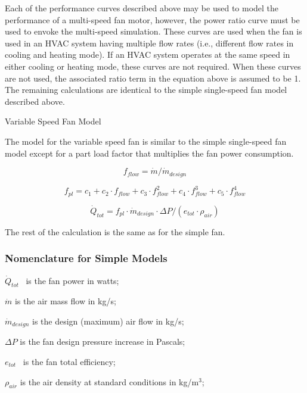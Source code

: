 Each of the performance curves described above may be used to model the performance of a multi-speed fan motor, however, the power ratio curve must be used to envoke the multi-speed simulation. These curves are used when the fan is used in an HVAC system having multiple flow rates (i.e., different flow rates in cooling and heating mode). If an HVAC system operates at the same speed in either cooling or heating mode, these curves are not required. When these curves are not used, the associated ratio term in the equation above is assumed to be 1. The remaining calculations are identical to the simple single-speed fan model described above.

Variable Speed Fan Model

The model for the variable speed fan is similar to the simple single-speed fan model except for a part load factor that multiplies the fan power consumption.

\begin{equation}
{f_{flow}} = \dot m/{\dot m_{design}}
\end{equation}

\begin{equation}
{f_{pl}} = {c_1} + {c_2} \cdot {f_{flow}} + {c_3} \cdot f_{flow}^2 + {c_4} \cdot f_{flow}^3 + {c_5} \cdot f_{flow}^4
\end{equation}

\begin{equation}
{\dot Q_{tot}} = {f_{pl}}\cdot {\dot m_{design}}\cdot \Delta P/\left( {{e_{tot}}\cdot {\rho_{air}}} \right)
\end{equation}

The rest of the calculation is the same as for the simple fan.

\subsubsection{Nomenclature for Simple Models}\label{nomenclature-for-simple-models}

\({\dot Q_{tot}}\) ~is the fan power in watts;

\(\dot m\) is the air mass flow in kg/s;

\({\dot m_{design}}\) is the design (maximum) air flow in kg/s;

\(\Delta P\) is the fan design pressure increase in Pascals;

\({e_{tot}}\) ~is the fan total efficiency;

\({\rho_{air}}\) is the air density at standard conditions in kg/m\(^{3}\);

